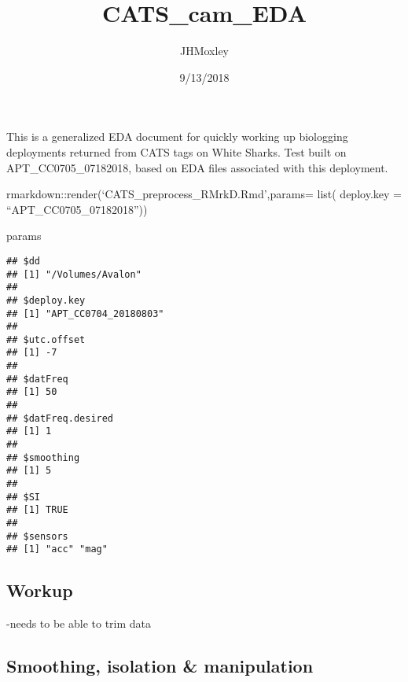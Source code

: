 \documentclass[]{article}
\title{CATS\_cam\_EDA}
\author{JHMoxley}
\date{9/13/2018}
\newenvironment{Shaded}{\begin{snugshade}}{\end{snugshade}}
\newcommand{\NormalTok}[1]{{#1}}
\begin{document}
\maketitle

This is a generalized EDA document for quickly working up biologging
deployments returned from CATS tags on White Sharks. Test built on
APT\_CC0705\_07182018, based on EDA files associated with this
deployment.

rmarkdown::render(`CATS\_preprocess\_RMrkD.Rmd',params= list( deploy.key
= ``APT\_CC0705\_07182018''))

\begin{Shaded}
\begin{Highlighting}[]
\NormalTok{params}
\end{Highlighting}
\end{Shaded}

\begin{verbatim}
## $dd
## [1] "/Volumes/Avalon"
## 
## $deploy.key
## [1] "APT_CC0704_20180803"
## 
## $utc.offset
## [1] -7
## 
## $datFreq
## [1] 50
## 
## $datFreq.desired
## [1] 1
## 
## $smoothing
## [1] 5
## 
## $SI
## [1] TRUE
## 
## $sensors
## [1] "acc" "mag"
\end{verbatim}

\subsection{Workup}\label{workup}

-needs to be able to trim data

\subsection{Smoothing, isolation \&
manipulation}\label{smoothing-isolation-manipulation}
\end{document}
